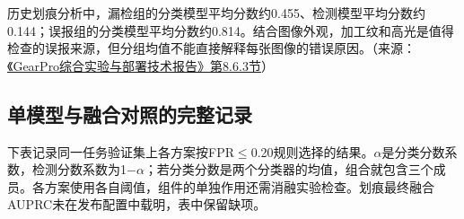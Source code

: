 历史划痕分析中，漏检组的分类模型平均分数约0.455、检测模型平均分数约0.144；误报组的分类模型平均分数约0.814。结合图像外观，加工纹和高光是值得检查的误报来源，但分组均值不能直接解释每张图像的错误原因。（来源：\protect\href{run:../../GearPro_综合技术报告_Markdown含配图/GearPro_综合实验与部署技术报告.md}{《GearPro综合实验与部署技术报告》第8.6.3节}）

\FloatBarrier{}\subsection{单模型与融合对照的完整记录}
下表记录同一任务验证集上各方案按FPR\ensuremath{\leq}0.20规则选择的结果。\ensuremath{\alpha}是分类分数系数，检测分数系数为1\ensuremath{-}\ensuremath{\alpha}；若分类分数是两个分类器的均值，组合就包含三个成员。各方案使用各自阈值，组件的单独作用还需消融实验检查。划痕最终融合AUPRC未在发布配置中载明，表中保留缺项。


